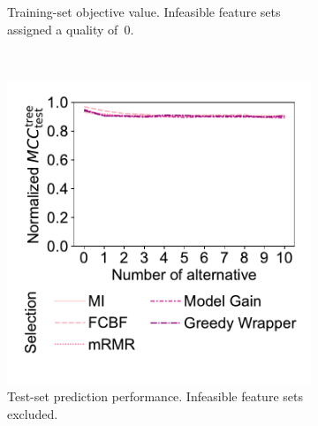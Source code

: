 \documentclass{article}
\theoremstyle{definition}
\begin{document}
\begin{figure}[p]
\begin{subfigure}[t]{0.48\textwidth}
		\caption{
			Training-set objective value.
			Infeasible feature sets assigned a quality of~0.
		}
		\label{fig:afs:impact-num-alternatives-fs-method-train-objective-max-fillna}
	\end{subfigure}
	\\ \vspace{\baselineskip}
	\begin{subfigure}[t]{0.48\textwidth}
		\centering
		\includegraphics[width=\textwidth, trim=20 35 15 15, clip]{plots/afs-impact-num-alternatives-fs-method-decision-tree-test-mcc-max.pdf}
		\caption{
			Test-set prediction performance.
			Infeasible feature sets excluded.
		}
		\label{fig:afs:impact-num-alternatives-fs-method-decision-tree-test-mcc-max}
	\end{subfigure}
	\hfill
	\begin{subfigure}[t]{0.48\textwidth}
		\centering

\end{subfigure}
\end{figure}
\end{document}
